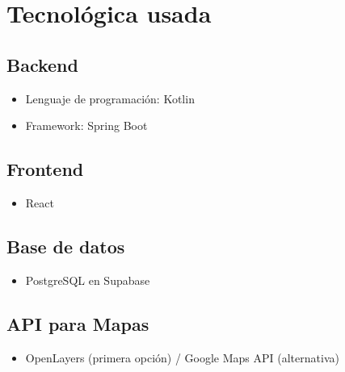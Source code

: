 \section{Tecnológica usada}

\subsection*{Backend}
\begin{itemize}
    \item Lenguaje de programación: Kotlin
    \item Framework: Spring Boot
\end{itemize}

\subsection*{Frontend}
\begin{itemize}
    \item React    
\end{itemize}

\subsection*{Base de datos}
\begin{itemize}
    \item PostgreSQL en Supabase
\end{itemize}

\subsection*{API para Mapas}
\begin{itemize}
    \item OpenLayers (primera opción) / Google Maps API (alternativa)
\end{itemize}